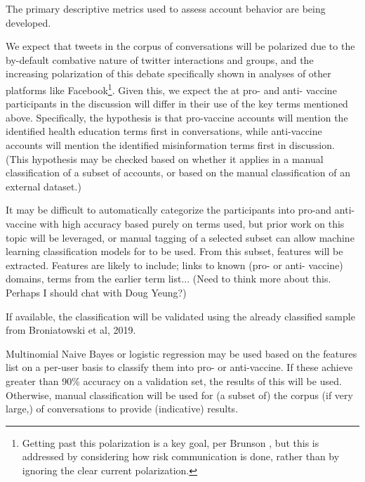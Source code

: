 \documentclass{article}
\begin{document}
The primary descriptive metrics used to assess account behavior are being developed.

We expect that tweets in the corpus of conversations will be polarized due to the by-default combative nature of twitter interactions and groups\cite{Sunstein2002,Yardi2010}, and the increasing polarization of this debate specifically\cite{Witteman2012} shown in analyses of other platforms like Facebook\cite{Schmidt2018}\footnote{Getting past this polarization is a key goal, per Brunson \cite{Brunson2017}, but this is addressed by considering how risk communication is done, rather than by ignoring the clear current polarization.}. Given this, we expect the at pro- and anti- vaccine participants in the discussion will differ in their use of the key terms mentioned above. Specifically, the hypothesis is that pro-vaccine accounts will mention the identified health education terms first in conversations, while anti-vaccine accounts will mention the identified misinformation terms first in discussion. (This hypothesis may be checked based on whether it applies in a manual classification of a subset of accounts, or based on the manual classification of an external dataset.)

It may be difficult to automatically categorize the participants into pro-and anti-vaccine with high accuracy based purely on terms used, but prior work on this topic will be leveraged, or manual tagging of a selected subset can allow machine learning classification models for to be used. From this subset, features will be extracted. Features are likely to include; links to known (pro- or anti- vaccine) domains, terms from the earlier term list... (Need to think more about this. Perhaps I should chat with Doug Yeung?)

If available, the classification will be validated using the already classified sample from Broniatowski et al, 2019.

Multinomial Naive Bayes or logistic regression may be used based on the features list on a per-user basis to classify them into pro- or anti-vaccine. If these achieve greater than 90\% accuracy on a validation set, the results of this will be used. Otherwise, manual classification will be used for (a subset of) the corpus (if very large,) of conversations to provide (indicative) results.



\end{document}
